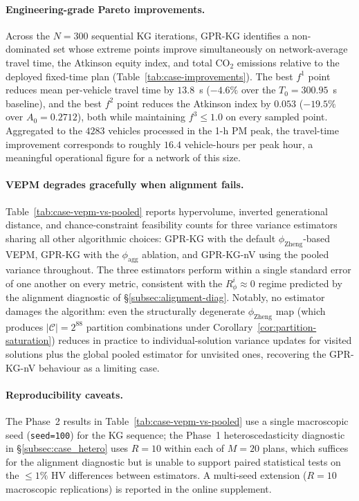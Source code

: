 \paragraph{Engineering-grade Pareto improvements.}
Across the $N=300$ sequential KG iterations, GPR-KG identifies a
non-dominated set whose extreme points improve simultaneously on
network-average travel time, the Atkinson equity index, and total CO$_2$
emissions relative to the deployed fixed-time plan
(Table~\ref{tab:case-improvements}).  The best $f^{1}$ point reduces
mean per-vehicle travel time by $13.8$~s ($-4.6\%$ over the $T_{0}=300.95$~s
baseline), and the best $f^{2}$ point reduces the Atkinson index by
$0.053$ ($-19.5\%$ over $A_{0}=0.2712$), both while maintaining
$f^{3}\le 1.0$ on every sampled point.  Aggregated to the $4283$
vehicles processed in the 1-h PM peak, the travel-time improvement
corresponds to roughly $16.4$ vehicle-hours per peak hour, a meaningful
operational figure for a network of this size.

\paragraph{VEPM degrades gracefully when alignment fails.}
Table~\ref{tab:case-vepm-vs-pooled} reports hypervolume, inverted
generational distance, and chance-constraint feasibility counts for
three variance estimators sharing all other algorithmic choices:
GPR-KG with the default $\phi_{\mathrm{Zheng}}$-based VEPM, GPR-KG with
the $\phi_{\mathrm{agg}}$ ablation, and GPR-KG-nV using the pooled
variance throughout.  The three estimators perform within a single
standard error of one another on every metric, consistent with the
$R_\phi^{i}\approx 0$ regime predicted by the alignment diagnostic of
\S\ref{subsec:alignment-diag}.  Notably, no estimator damages the
algorithm: even the structurally degenerate $\phi_{\mathrm{Zheng}}$ map
(which produces $|\mathcal{C}|=2^{88}$ partition combinations under
Corollary~\ref{cor:partition-saturation}) reduces in practice to
individual-solution variance updates for visited solutions plus the
global pooled estimator for unvisited ones, recovering the GPR-KG-nV
behaviour as a limiting case.

\paragraph{Reproducibility caveats.}
The Phase~2 results in Table~\ref{tab:case-vepm-vs-pooled} use a single
macroscopic seed (\texttt{seed=100}) for the KG sequence; the Phase~1
heteroscedasticity diagnostic in \S\ref{subsec:case_hetero} uses
$R=10$ within each of $M=20$ plans, which suffices for the alignment
diagnostic but is unable to support paired statistical tests on the
$\le 1\%$ HV differences between estimators.  A multi-seed extension
($R=10$ macroscopic replications) is reported in the online supplement.


